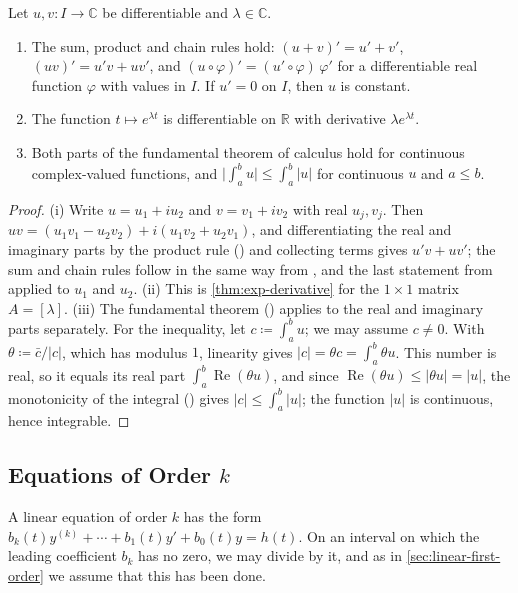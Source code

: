 \begin{lemma}
\label{lem:complex-calculus}
Let $u,v\colon I\to\mathbb C$ be differentiable and $\lambda\in\mathbb C$.
\begin{enumerate}
\item The sum, product and chain rules hold: $(u+v)'=u'+v'$, $(uv)'=u'v+uv'$, and $(u\circ\varphi)'=(u'\circ\varphi)\,\varphi'$ for a differentiable real function $\varphi$ with values in $I$. If $u'=0$ on $I$, then $u$ is constant.
\item The function $t\mapsto e^{\lambda t}$ is differentiable on $\mathbb R$ with derivative $\lambda e^{\lambda t}$.
\item Both parts of the fundamental theorem of calculus hold for continuous complex-valued functions, and $\bigl|\int_a^bu\bigr|\le\int_a^b|u|$ for continuous $u$ and $a\le b$.
\end{enumerate}
\end{lemma}

\begin{proof}
(i) Write $u=u_1+iu_2$ and $v=v_1+iv_2$ with real $u_j,v_j$. Then $uv=(u_1v_1-u_2v_2)+i(u_1v_2+u_2v_1)$, and differentiating the real and imaginary parts by the product rule () and collecting terms gives $u'v+uv'$; the sum and chain rules follow in the same way from , and the last statement from  applied to $u_1$ and $u_2$. (ii) This is \cref{thm:exp-derivative} for the $1\times1$ matrix $A=[\lambda]$. (iii) The fundamental theorem () applies to the real and imaginary parts separately. For the inequality, let $c\coloneqq\int_a^bu$; we may assume $c\ne0$. With $\theta\coloneqq\bar c/|c|$, which has modulus $1$, linearity gives $|c|=\theta c=\int_a^b\theta u$. This number is real, so it equals its real part $\int_a^b\operatorname{Re}(\theta u)$, and since $\operatorname{Re}(\theta u)\le|\theta u|=|u|$, the monotonicity of the integral () gives $|c|\le\int_a^b|u|$; the function $|u|$ is continuous, hence integrable.
\end{proof}

\subsection{Equations of Order \texorpdfstring{$k$}{k}}

A linear equation of order $k$ has the form $b_k(t)y^{(k)}+\cdots+b_1(t)y'+b_0(t)y=h(t)$. On an interval on which the leading coefficient $b_k$ has no zero, we may divide by it, and as in \cref{sec:linear-first-order} we assume that this has been done.


